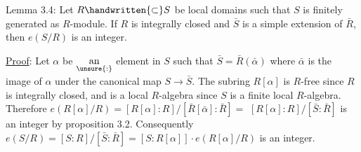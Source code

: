 Lemma 3.4: Let $R\handwritten{\subset} S$ be local domains such that $S$ is finitely
generated as $R$-module. If $R$ is integrally closed and $\bar S$ is a simple
extension of $\bar R$, then $e(S/R)$ is an integer.

\uline{Proof}: Let $\alpha$ be $\underset{\unsure{:}}{\text{an}}$ element in $S$ such that $\bar S=\bar R(\bar\alpha)$ where $\bar\alpha$ is the
image of $\alpha$ under the canonical map $S\longrightarrow\bar S$. The subring $R[\alpha]$ is $R$-free
since $R$ is integrally closed, and is a local $R$-algebra since $S$ is a finite
local $R$-algebra. Therefore $e(R[\alpha]/R)=[R[\alpha]:R]/[\bar R[\bar\alpha]:\bar R]=$
$[R[\alpha]:R]/[\bar S:\bar R]$ is an integer by proposition 3.2. Consequently
$e(S/R)=[S:R]/[\bar S:\bar R]=[S:R[\alpha]]\cdot e(R[\alpha]/R)$ is an integer.
